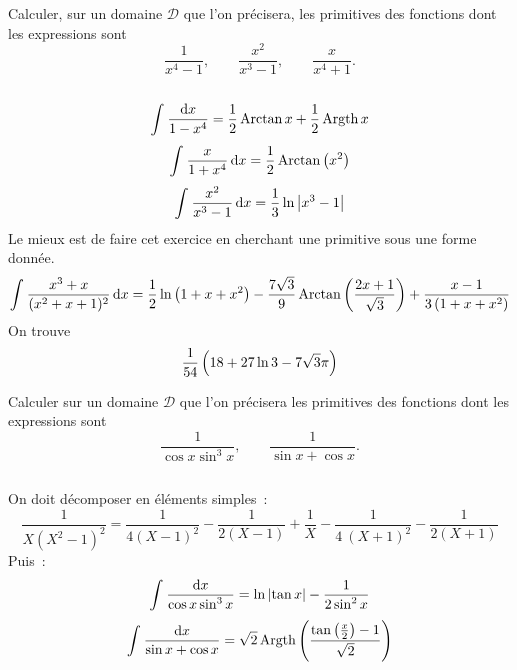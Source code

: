 \documentclass{magnolia}
\begin{document}


Calculer, sur un domaine $\mathcal{D}$ que l'on précisera, les primitives des
  fonctions dont les expressions sont
  \[\frac{1}{x^4-1}, \qquad \frac{x^2}{x^3-1}, \qquad \frac{x}{x^4+1}.\]
\begin{sol}
$\quad$
\begin{questions}
\question
  \[\priminv{1-x^4}{x}=\frac{1}{2}\arctan x+\frac{1}{2}\argth x\]
  \[\prim{\frac{x}{1+x^4}}{x}=\frac{1}{2}\arctan\p{x^2}\]
  \[\prim{\frac{x^2}{x^3-1}}{x}=\frac{1}{3}\ln\abs{x^3-1}\]
\question Le mieux est de faire cet exercice en cherchant une primitive sous
  une forme donnée.
  \[\prim{\frac{x^3+x}{(x^2+x+1)^2}}{x}=\frac{1}{2} \ln\p{1+x+x^2}
    -\frac{7\sqrt{3}}{9}
    \arctan\p{\frac{2 x+1}{\sqrt{3}}}+\frac{x-1}{3 \p{1+x+x^2}}\]
  On trouve
  \[\frac{1}{54}\p{18+27\ln 3-7\sqrt{3}\pi}\]
\end{questions}
\end{sol}



Calculer sur un domaine $\mathcal{D}$ que l'on précisera les primitives des
fonctions dont les expressions sont
\[\frac{1}{\cos x\sin^3 x}, \qquad \frac{1}{\sin x+\cos x}.\]
\begin{sol}
$\quad$
\begin{questions}
  \question On doit décomposer en éléments simples~:
  \[\frac{1}{X \left(X^2-1 \right)^2}=
    \frac{1}{4 (X-1)^2}-\frac{1}{2 (X-1)}+\frac{1}{X}-\frac{1}{4 \
    (X+1)^2}-\frac{1}{2 (X+1)}\]
  Puis~:
  \[\priminv{\cos x\sin^3 x}{x}=\ln\abs{\tan x}-\frac{1}{2\sin^2 x}\]
\question
  \[\priminv{\sin x+\cos x}{x}=\sqrt{2}
    \argth\p{\frac{\tan\p{\frac{x}{2}}-1}{\sqrt{2}}}\]
\end{questions}
\end{sol}

\end{document}
